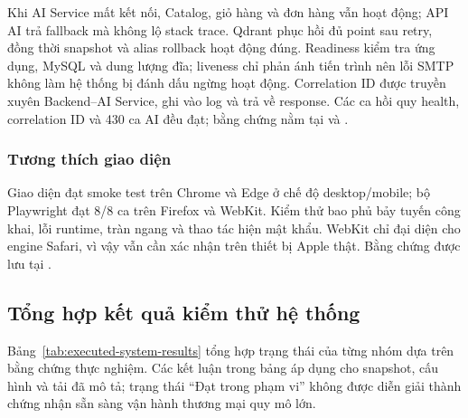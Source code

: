 Khi AI Service mất kết nối, Catalog, giỏ hàng và đơn hàng vẫn hoạt động; API AI trả fallback mà không lộ stack trace. Qdrant phục hồi đủ point sau retry, đồng thời snapshot và alias rollback hoạt động đúng. Readiness kiểm tra ứng dụng, MySQL và dung lượng đĩa; liveness chỉ phản ánh tiến trình nên lỗi SMTP không làm hệ thống bị đánh dấu ngừng hoạt động. Correlation ID được truyền xuyên Backend--AI Service, ghi vào log và trả về response. Các ca hồi quy health, correlation ID và 430 ca AI đều đạt; bằng chứng nằm tại  và .

\subsubsection{Tương thích giao diện}

Giao diện đạt smoke test trên Chrome và Edge ở chế độ desktop/mobile; bộ Playwright đạt 8/8 ca trên Firefox và WebKit. Kiểm thử bao phủ bảy tuyến công khai, lỗi runtime, tràn ngang và thao tác hiện mật khẩu. WebKit chỉ đại diện cho engine Safari, vì vậy vẫn cần xác nhận trên thiết bị Apple thật. Bằng chứng được lưu tại .

\subsection{Tổng hợp kết quả kiểm thử hệ thống}

Bảng~\ref{tab:executed-system-results} tổng hợp trạng thái của từng nhóm dựa trên bằng chứng thực nghiệm. Các kết luận trong bảng áp dụng cho snapshot, cấu hình và tải đã mô tả; trạng thái \enquote{Đạt trong phạm vi} không được diễn giải thành chứng nhận sẵn sàng vận hành thương mại quy mô lớn.

